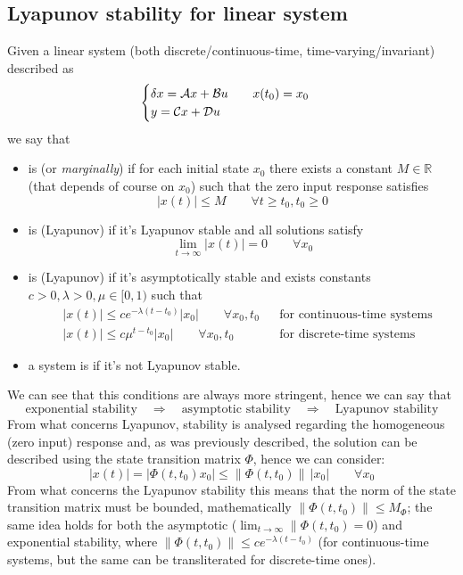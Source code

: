 	\subsection*{Lyapunov stability for linear system}
	Given a linear system (both discrete/continuous-time, time-varying/invariant) described as
	\[ \begin{cases}
		\delta x = \mathcal{A} x + \mathcal{B} u \qquad x(t_0) = x_0 \\ y= \mathcal{C} x + \mathcal{D} u
	\end{cases} \]
	we say that
	\begin{itemize}
		\item is  (or \textit{marginally})  if for each initial state $x_0$ there exists a constant $M\in \mathds R$ (that depends of course on $x_0$) such that the zero input response satisfies
		\[ |x(t)| \leq M \qquad \forall t\geq t_0,t_0 \geq 0 \]
		\item is (Lyapunov)  if it's Lyapunov stable and all solutions satisfy
		\[ \lim_{t\rightarrow \infty} |x(t)|=0 \qquad \forall x_0 \]
		\item is (Lyapunov)  if it's asymptotically stable and exists constants $c>0, \lambda > 0, \mu \in [0,1)$ such that
		\begin{align*}
			& |x(t)| \leq ce^{-\lambda(t-t_0)} |x_0| \qquad \forall x_0,t_0 &&  \textrm{for continuous-time systems} \\
			& |x(t)| \leq c\mu^{t-t_0} |x_0| \qquad \forall x_0,t_0 &&  \textrm{for discrete-time systems} 
		\end{align*}
		\item a system is  if it's not Lyapunov stable.
	\end{itemize}
	We can see that this conditions are always more stringent, hence we can say that
	\[ \textrm{exponential stability} \quad \Rightarrow \quad \textrm{asymptotic stability} \quad \Rightarrow \quad \textrm{Lyapunov stability} \]
	From what concerns Lyapunov, stability is analysed regarding the homogeneous (zero input) response and, as was previously described, the solution can be described using the state transition matrix $\Phi$, hence we can consider:
	\[ |x(t)| = |\Phi(t,t_0)x_0| \leq \|\Phi(t,t_0)\|\, |x_0| \qquad \forall x_0 \]
	From what concerns the Lyapunov stability this means that the norm of the state transition matrix must be bounded, mathematically $\|\Phi(t,t_0)\| \leq M_\Phi$; the same idea holds for both the asymptotic ($\lim_{t\rightarrow \infty} \|\Phi(t,t_0) = 0$) and exponential stability, where $\|\Phi(t,t_0)\| \leq c e^{-\lambda(t-t_0)}$ (for continuous-time systems, but the same can be transliterated for discrete-time ones).
	
